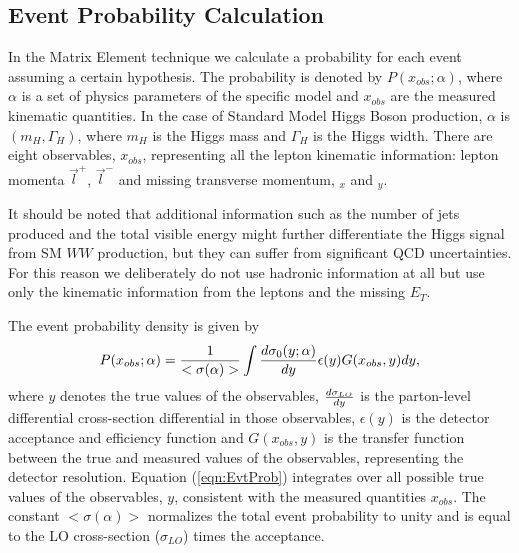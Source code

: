 \subsection{Event Probability Calculation}

In the Matrix Element technique we calculate a probability  for each event assuming a
certain hypothesis.  The probability is denoted by $P(x_{obs};\alpha)$,
where $\alpha$ is a set of physics 
parameters of the specific model and $x_{obs}$ are the measured kinematic quantities.
In the case of Standard Model Higgs Boson production,
 $\alpha$ is $(m_H, \Gamma_H)$, where  $m_H$ is the Higgs mass 
and $\Gamma_H$ is the Higgs width. There are eight observables, $x_{obs}$, representing all the 
lepton kinematic information: lepton momenta $\vec{l}^+$, $\vec{l}^-$ and missing 
transverse momentum, \met$_x$ and \met$_y$.

It should be noted that additional information such as the number of jets
produced and the total visible energy might further differentiate the Higgs signal from SM
$WW$ production,
but they can suffer from significant  QCD uncertainties. For this reason we 
deliberately do not use hadronic information at all but use
only the kinematic information from the leptons and the missing $E_T$.

The event probability density is given by
\begin{equation}
P(x_{obs};\alpha) =
 {1 \over < \sigma(\alpha) > }
 \int \frac {d \sigma_{0} (y;\alpha) }{ dy }
 \epsilon (y) G(x_{obs},y) dy,  
\label{eqn:EvtProb}  
\end{equation}
where $y$ denotes the true values of the observables,
$d \sigma_{LO} \over  dy$ is the  parton-level differential cross-section differential
in those observables, $\epsilon(y)$ is the detector acceptance and efficiency function
and $G(x_{obs},y)$ is the transfer function between the true and measured values of the
observables, representing the detector resolution.
Equation (\ref{eqn:EvtProb}) integrates over all possible true values of the
observables, $y$, consistent with the measured quantities $x_{obs}$.
The constant $<\sigma(\alpha)>$ normalizes the total event probability to unity
and is equal to the LO cross-section ($\sigma_{LO}$) times the acceptance.

